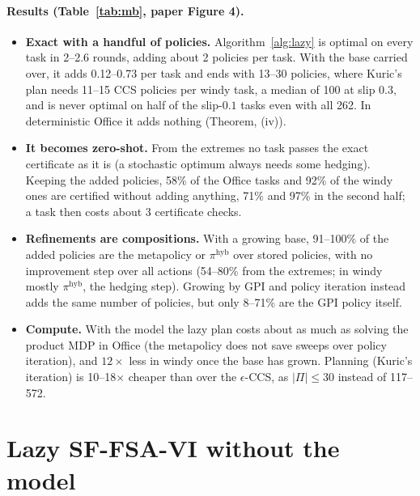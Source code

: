 \documentclass[11pt]{article}
\begin{document}
\paragraph{Results (Table~\ref{tab:mb}, paper Figure 4).}
\begin{itemize}\setlength\itemsep{2pt}
\item \textbf{Exact with a handful of policies.} Algorithm~\ref{alg:lazy} is optimal on every task in 2--2.6 rounds,
adding about 2 policies per task. With the base carried over, it adds 0.12--0.73 per task and ends with 13--30 policies,
where Kuric's plan needs 11--15 CCS policies per windy task, a median of 100 at slip $0.3$, and is never optimal on half
of the slip-$0.1$ tasks even with all 262. In deterministic Office it adds nothing (Theorem, (iv)).
\item \textbf{It becomes zero-shot.} From the extremes no task passes the exact certificate as it is (a stochastic
optimum always needs some hedging). Keeping the added policies, 58\% of the Office tasks and 92\% of the windy ones are
certified without adding anything, 71\% and 97\% in the second half; a task then costs about 3 certificate checks.
\item \textbf{Refinements are compositions.} With a growing base, 91--100\% of the added policies are the metapolicy
or $\pi^{\mathrm{hyb}}$ over stored policies, with no improvement step over all actions (54--80\% from the extremes; in
windy mostly $\pi^{\mathrm{hyb}}$, the hedging step). Growing by GPI and policy iteration instead adds the same number of
policies, but only 8--71\% are the GPI policy itself.
\item \textbf{Compute.} With the model the lazy plan costs about as much as solving the product MDP in Office (the
metapolicy does not save sweeps over policy iteration), and $12\times$ less in windy once the base has grown. Planning
(Kuric's iteration) is 10--18$\times$ cheaper than over the $\epsilon$-CCS, as $|\Pi|\le30$ instead of 117--572.
\end{itemize}

\section{Lazy SF-FSA-VI without the model}\label{sec:mf}
\end{document}
